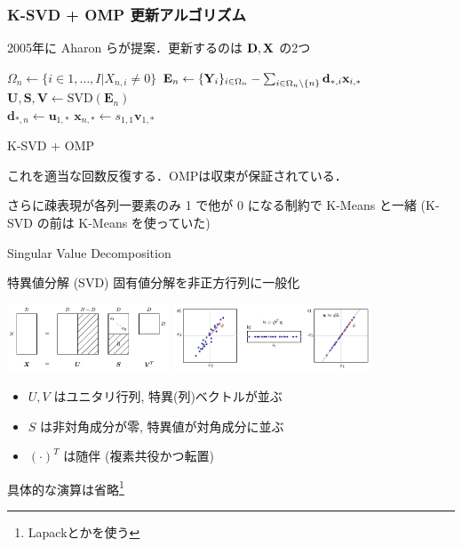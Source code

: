 \begin{frame}\frametitle{K-SVD + OMP 更新アルゴリズム}
2005年に Aharon らが提案\cite{Aharon2005}．更新するのは ${\mathbf{D}}, {\mathbf{X}}$ の2つ
\begin{algorithm}[H]
\begin{algorithmic}[1]
\STATE $\Omega_n \leftarrow \{ i \in {1, \dots, I} | X_{n, i} \neq 0 \}$
\STATE $\mathbf{E}_n \leftarrow \{{\mathbf{Y}}_i\}_{i \in \Omega_n} - \sum_{i \in \Omega_n \setminus \{n\}} \mathbf{d}_{*,i} \mathbf{x}_{i,*}$
\STATE $\mathbf{U, S, V} \leftarrow \mathrm{SVD}(\mathbf{E}_n)$ \\
\STATE $\mathbf{d}_{*,n} \leftarrow \mathbf{u}_{1,*}$
\STATE $\mathbf{x}_{n,*} \leftarrow s_{1,1} \mathbf{v}_{1,*}$
\ENDFOR
\end{algorithmic}
\caption{K-SVD + OMP}
\label{alg:seq}
\end{algorithm}
これを適当な回数反復する．OMPは収束が保証されている．

さらに疎表現が各列一要素のみ 1 で他が 0 になる制約で K-Means と一緒 (K-SVD の前は K-Means を使っていた)
\end{frame}


\begin{frame}{Singular Value Decomposition}
\begin{block}{特異値分解 (SVD)}
固有値分解を非正方行列に一般化

\includegraphics[height=2cm]{figure/svd.png}
\includegraphics[height=2cm]{figure/svd1.png}

\begin{itemize}
    \item $U, V$ はユニタリ行列, 特異(列)ベクトルが並ぶ
    \item $S$ は非対角成分が零, 特異値が対角成分に並ぶ
    \item $(\cdot)^T$ は随伴 (複素共役かつ転置)
\end{itemize}
\end{block}
具体的な演算は省略\footnote{Lapackとかを使う}
\end{frame}


